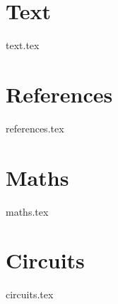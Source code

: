 \documentclass{report}
\begin{document}
\chapter{Text}
    {text.tex}
\chapter{References}
    {references.tex}
\chapter{Maths}
    {maths.tex}
\chapter{Circuits}
    {circuits.tex}
\end{document}

